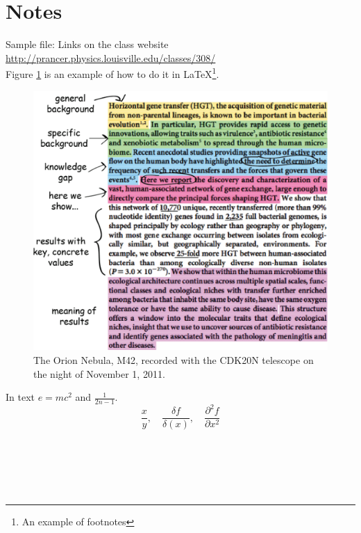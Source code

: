 
\newpage
\section{Notes}

Sample file: Links on the class website \url{http://prancer.physics.louisville.edu/classes/308/} \\
Figure \ref{fig:graph1} is an example of  how to do it in \LaTeX \footnote{An example of footnotes}.
\begin{figure}[h]  %
	\begin{center}
	\includegraphics[scale=0.5]{image/good_abstract.png}
	\end{center}
	\caption{The Orion Nebula, M42, recorded with the CDK20N telescope on the night of November 1, 2011.}
	\label{fig:graph1}
\end{figure}

In text $e=mc^2$ and $\frac{1}{2n-1}$.\\

\begin{equation}
\frac{x}{y}, \quad
\frac{\delta{f}}{\delta(x)},\quad
\frac{\partial^{2}{f}}{\partial{x}{^2}}
\end{equation}


\cite{kalker1991wheel}\\
\cite{sudsang2000grasping}\\
\cite{van2015learning}\\
\cite{yousef2011tactile}\\
    
